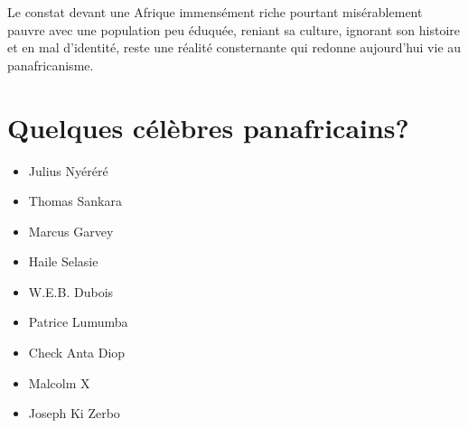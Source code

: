	Le constat devant une Afrique immensément riche pourtant misérablement pauvre avec une population peu éduquée, reniant sa culture,
	ignorant son histoire et en mal d'identité, reste une réalité consternante qui redonne aujourd'hui vie au panafricanisme.
	
	\section{Quelques célèbres panafricains?}
	\begin{itemize}
		\item Julius Nyéréré
		\item Thomas Sankara
		\item Marcus Garvey
		\item Haile Selasie
		\item W.E.B. Dubois
		\item Patrice Lumumba
		\item Check Anta Diop
		\item Malcolm X
		\item Joseph Ki Zerbo
	\end{itemize}
	\clearpage